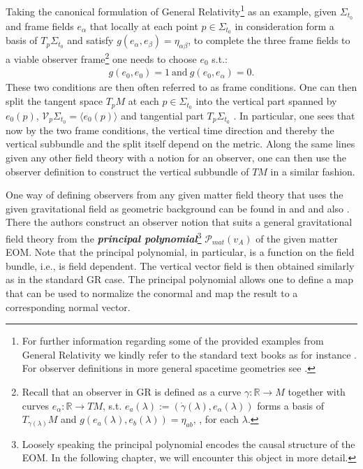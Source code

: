 Taking the canonical formulation of General Relativity\footnote{For further information regarding some of the provided examples from General Relativity we kindly refer to the standard text books as for instance \cite{Misner1973}. For observer definitions in more general spacetime geometries see \cite{2011PhRvD..83d4047R}.} as an example, given $\Sigma_{t_0}$ and frame fields $e_{\alpha}$ that locally at each point $p \in \Sigma_{t_0}$ in consideration form a basis of $T_p\Sigma_{t_0}$ and satisfy $g(e_{\alpha},e_{\beta}) = \eta_{\alpha \beta}$, to complete the three frame fields to a viable observer frame\footnote{Recall that an observer in GR is defined as a curve $\gamma : \mathbb{R} \rightarrow M$ together with curves $e_{\alpha} : \mathbb{R} \rightarrow TM$, s.t. $ e_a(\lambda) :=(\dot{\gamma}(\lambda),e_{\alpha}(\lambda))$ forms a basis of $T_{\gamma(\lambda)}M$ and $g(e_a(\lambda),e_b(\lambda)) = \eta_{ab}$, , for each $\lambda$.} one needs to choose $e_0$ s.t.:
\begin{align}
    g(e_0,e_0) = 1 \ \text{and} \ g(e_0,e_{\alpha}) = 0.
\end{align}
These two conditions are then often referred to as frame conditions. One can then split the tangent space $T_pM$ at each $p \in \Sigma_{t_0}$ into the vertical part spanned by $e_0(p)$,  $\mathcal{V}_p\Sigma_{t_0} = \langle  e_0(p) \rangle$ and tangential part $T_p\Sigma_{t_0}$ . In particular, one sees that now by the two frame conditions, the vertical time direction and thereby the vertical subbundle and the split itself depend on the metric. Along the same lines given any other field theory with a notion for an observer, one can then use the observer definition to construct the vertical subbundle of $TM$ in a similar fashion. 

One way of defining observers from any given matter field theory that uses the given gravitational field as geometric background can be found in \cite{2018PhRvD..97h4036D} and \cite{2011PhRvD..83d4047R} and also \cite{Rivera}. There the authors construct an observer notion that suits a general gravitational field theory from the \textbf{\textit{principal polynomial}}\footnote{Loosely speaking the principal polynomial encodes the causal structure of the EOM. In the following chapter, we will encounter this object in more detail.} $\mathcal{P}_{mat}(v_A)$ of the given matter EOM. Note that the principal polynomial, in particular, is a function on the field bundle, i.e., is field dependent. The vertical vector field is then obtained similarly as in the standard GR case. The principal polynomial allows one to define a map that can be used to normalize the conormal and map the result to a corresponding normal vector.


